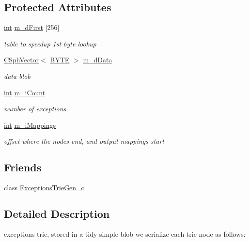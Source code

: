 \subsection*{Protected Attributes}
\begin{DoxyCompactItemize}
\item 
\hyperlink{sphinxexpr_8cpp_a4a26e8f9cb8b736e0c4cbf4d16de985e}{int} \hyperlink{classExceptionsTrie__c_af5ef1a96af3696fd67c25f98966fb132}{m\-\_\-d\-First} \mbox{[}256\mbox{]}
\begin{DoxyCompactList}\small\item\em table to speedup 1st byte lookup \end{DoxyCompactList}\item 
\hyperlink{classCSphVector}{C\-Sph\-Vector}$<$ \hyperlink{sphinxstd_8h_a4ae1dab0fb4b072a66584546209e7d58}{B\-Y\-T\-E} $>$ \hyperlink{classExceptionsTrie__c_ad345df1e9df368e943698c49142972eb}{m\-\_\-d\-Data}
\begin{DoxyCompactList}\small\item\em data blob \end{DoxyCompactList}\item 
\hyperlink{sphinxexpr_8cpp_a4a26e8f9cb8b736e0c4cbf4d16de985e}{int} \hyperlink{classExceptionsTrie__c_abe897f188365bfb27cd2a9f48428abb1}{m\-\_\-i\-Count}
\begin{DoxyCompactList}\small\item\em number of exceptions \end{DoxyCompactList}\item 
\hyperlink{sphinxexpr_8cpp_a4a26e8f9cb8b736e0c4cbf4d16de985e}{int} \hyperlink{classExceptionsTrie__c_a3d3c390cfc017b064a309fefa688e901}{m\-\_\-i\-Mappings}
\begin{DoxyCompactList}\small\item\em offset where the nodes end, and output mappings start \end{DoxyCompactList}\end{DoxyCompactItemize}
\subsection*{Friends}
\begin{DoxyCompactItemize}
\item 
class \hyperlink{classExceptionsTrie__c_a824c99a12cb6475c31a4a450c7337e64}{Exceptions\-Trie\-Gen\-\_\-c}
\end{DoxyCompactItemize}


\subsection{Detailed Description}
exceptions trie, stored in a tidy simple blob we serialize each trie node as follows\-:

